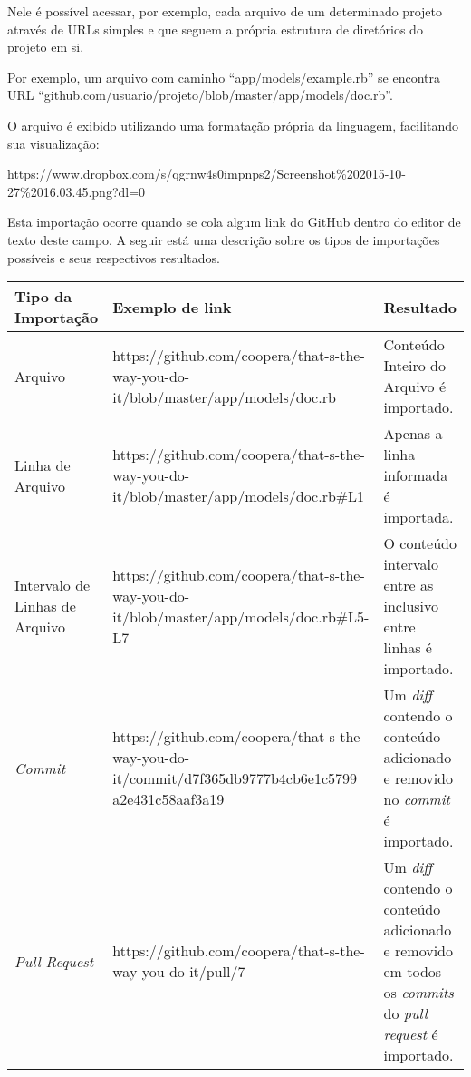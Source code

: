 Nele é possível acessar, por exemplo, cada arquivo de um determinado projeto através de URLs simples e que seguem a própria estrutura de diretórios do projeto em si.

Por exemplo, um arquivo com caminho ``app/models/example.rb'' se encontra URL ``github.com/usuario/projeto/blob/master/app/models/doc.rb''.

O arquivo é exibido utilizando uma formatação própria da linguagem, facilitando sua visualização:

https://www.dropbox.com/s/qgrnw4s0impnps2/Screenshot\%202015-10-27\%2016.03.45.png?dl=0


Esta importação ocorre quando se cola algum link do GitHub dentro do editor de texto deste campo. A seguir está uma descrição sobre os tipos de importações possíveis e seus respectivos resultados.

\begin{center}
    \begin{tabular}{| p{3cm} | p{7cm} | p{5cm} |}
    \hline
    Tipo da Importação & Exemplo de link & Resultado \\ \hline
    Arquivo & https://github.com/coopera/that-s-the-way-you-do-it/blob/master/app/models/doc.rb & Conteúdo Inteiro do Arquivo é importado. \\ \hline
    Linha de Arquivo & https://github.com/coopera/that-s-the-way-you-do-it/blob/master/app/models/doc.rb\#L1 & Apenas a linha informada é importada. \\ \hline
    Intervalo de Linhas de Arquivo & https://github.com/coopera/that-s-the-way-you-do-it/blob/master/app/models/doc.rb\#L5-L7 & O conteúdo intervalo entre as inclusivo entre linhas é importado. \\ \hline
    \textit{Commit} & https://github.com/coopera/that-s-the-way-you-do-it/commit/d7f365db9777b4cb6e1c5799 a2e431c58aaf3a19 & Um \textit{diff} contendo o conteúdo adicionado e removido no \textit{commit} é importado. \\ \hline
    \textit{Pull Request} & https://github.com/coopera/that-s-the-way-you-do-it/pull/7 & Um \textit{diff} contendo o conteúdo adicionado e removido em todos os \textit{commits} do \textit{pull request} é importado.  \\ \hline
    \end{tabular}
\end{center}


